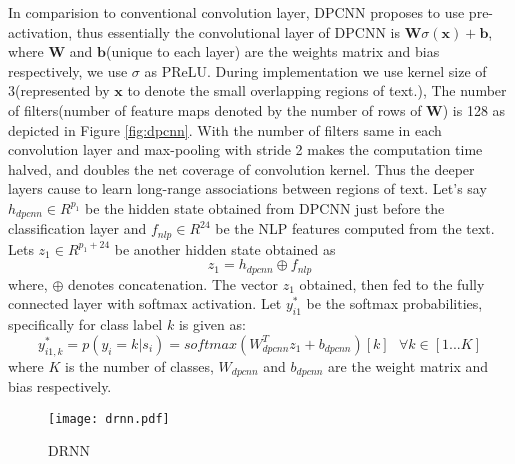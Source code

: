 \documentclass[sigconf]{acmart}
\begin{document}
In comparision to conventional convolution layer, DPCNN proposes to use pre-activation, thus essentially the convolutional layer of DPCNN is $\textbf{W}\sigma(\textbf{x})+\textbf{b}$, where $\textbf{W}$ and $\textbf{b}$(unique to each layer) are the weights matrix and bias respectively, we use $\sigma$ as PReLU\cite{he2015delving}. During implementation we use kernel size of 3(represented by $\textbf{x}$ to denote the small overlapping regions of text.), The number of filters(number of feature maps denoted by the number of rows of $\textbf{W}$) is 128 as depicted in Figure \ref{fig:dpcnn}. With the number of filters same in each convolution layer and max-pooling with stride 2 makes the computation time halved, and doubles the net coverage of convolution kernel. Thus the deeper layers cause to learn long-range associations between regions of text. Let's say $h_{dpcnn} \in R^{p_1}$ be the hidden state obtained from DPCNN just before the classification layer and $f_{nlp}  \in R^{24}$  be the NLP features computed from the text. Lets $z_1 \in R^{p_1 + 24}$ be another hidden state obtained as
\begin{equation}
    z_1 = h_{dpcnn} \oplus f_{nlp}
\end{equation}
where, $\oplus$ denotes concatenation. The vector $z_1$ obtained, then fed to the fully connected layer with softmax activation. Let $y_{i1}^*$ be the softmax probabilities, specifically for class label $k$ is given as:
\begin{equation}
    y_{i1,k}^{*} = p(y_i=k|s_i) = softmax(W_{dpcnn}^T z_1 + b_{dpcnn})[k] \textrm{ } \forall k \in [1...K]
    \label{softdpcnn}
\end{equation}
where $K$ is the number of classes, $W_{dpcnn}$ and $b_{dpcnn}$ are the weight matrix and bias respectively.
\begin{figure}[h]
    \centering
    \texttt{[image: drnn.pdf]}
    \caption{DRNN}
    \label{fig:drnn}
    \vspace{-2mm}
\end{figure}
\end{document}
